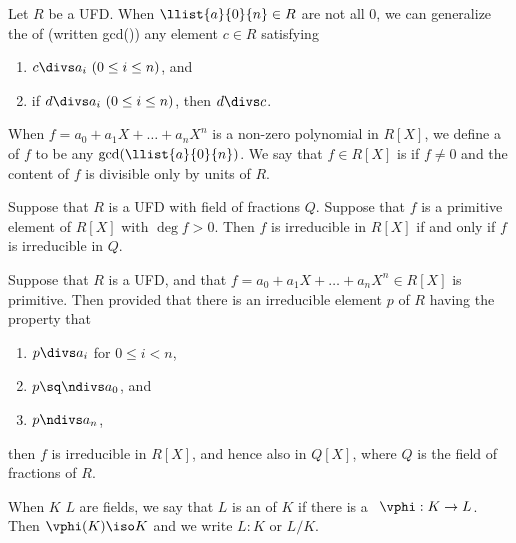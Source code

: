 \documentclass[a4paper]{article}
\begin{document}
\begin{tdefinition}
  Let \( R \) be a UFD.
  When \( \llist{a}{0}{n}\in R \) are not all 0, we can generalize the  of  (written gcd()) any element \( c\in R \) satisfying \begin{enumerate}[label=(\roman*)]
    \item \( c\divs a_i\ (0\leq i\leq n) \), and
    \item if \( d\divs a_i\ (0\leq i\leq n) \), then \( d\divs c \).
  \end{enumerate}
  When \( f=a_0+a_1X+\ldots +a_nX^n \) is a non-zero polynomial in \( R[X] \), we define a  of \( f \) to be any \( \gcd (\llist{a}{0}{n}) \).
  We say that \( f\in R[X] \) is  if \( f\neq 0 \) and the content of \( f \) is divisible only by units of \( R \).
\end{tdefinition}

\begin{tlemma}[Gauss]
  Suppose that \( R \) is a UFD with field of fractions \( Q \).
  Suppose that \( f \) is a primitive element of \( R[X] \) with \( \deg f > 0 \).
  Then \( f \) is irreducible in \( R[X] \) if and only if \( f \) is irreducible in \( Q \).
\end{tlemma}

\begin{ttheorem}
  Suppose that \( R \) is a UFD, and that \( f=a_0+a_1X+\ldots +a_nX^n \in R[X] \) is primitive.
  Then provided that there is an irreducible element \( p \) of \( R \) having the property that \begin{enumerate}[label=(\roman*)]
    \item \( p\divs a_i \) for \( 0\leq i < n \),
    \item \( p\sq \ndivs a_0 \), and
    \item \( p\ndivs a_n \),
  \end{enumerate}
  then \( f \) is irreducible in \( R[X] \), and hence also in \( Q[X] \), where \( Q \) is the field of fractions of \( R \).
\end{ttheorem}

\begin{tdefinition}
  When \( K \) \tand \( L \) are fields, we say that \( L \) is an  of \( K \) if there is a \homo~\( \vphi: K \to L \).
  Then \( \vphi(K)\iso K \) and we write \( L:K \) or \( L/K \).
\end{tdefinition}
\end{document}
